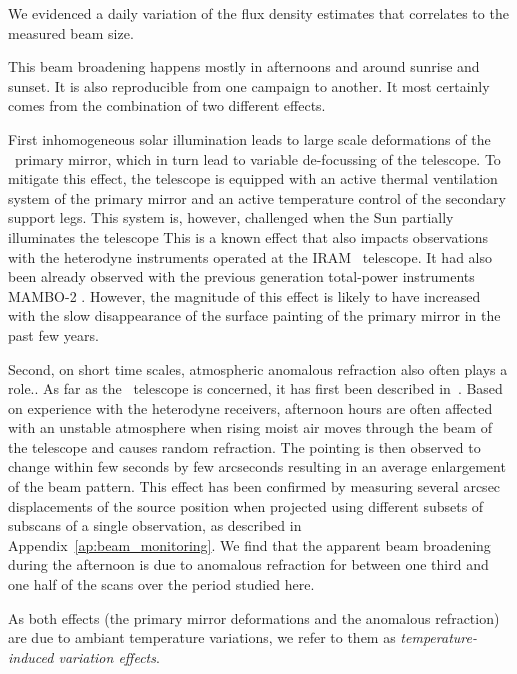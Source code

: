 We evidenced a daily variation of the flux density estimates that correlates to the
measured beam size.

This beam broadening happens mostly in afternoons and around
sunrise and sunset. It is also reproducible from one campaign to another. It most certainly
comes from the combination of two different effects.

First inhomogeneous solar illumination leads to large scale deformations of the
\trentemetre\ primary mirror, which in turn lead to variable de-focussing of the
telescope. {\lp To mitigate this effect, the telescope is equipped with an
  active thermal ventilation system of the primary mirror and an active
  temperature control of the secondary support legs. This system is, however,
  challenged when the Sun partially illuminates the telescope}
  {\lp This is a known effect that also impacts
  observations with the heterodyne instruments operated at the IRAM
  \trentemetre\ telescope. It had also been already observed with the previous
  generation total-power instruments MAMBO-2 \citep{Kreysa1999}.} However, the
magnitude of this effect is likely to have increased with the slow disappearance
of the surface painting of the primary mirror in the past few years.

Second, on short time scales, atmospheric anomalous refraction {\lp also often plays a
  role.}. As far as the \trentemetre\ telescope is concerned, it has first
been described in~\citet{Altenhoff1987}. Based on experience with
  the heterodyne receivers, afternoon hours are
  often affected with an unstable atmosphere when rising moist air moves
  through the beam of the telescope and causes random refraction. The pointing
  is then observed to change within few seconds by few arcseconds {\lp resulting in an average
    enlargement of the beam pattern.} This effect has been confirmed by
  measuring several arcsec displacements of the source position when projected using
  different subsets of subscans of a single observation, as described
  in Appendix~\ref{ap:beam_monitoring}. We find that the apparent beam broadening during
  the afternoon is due to anomalous refraction for between one third
  and one half of the scans over the period studied here.


{\lp As both effects (the primary mirror deformations and the anomalous
  refraction) are due to ambiant temperature variations, we refer to them as
  \emph{temperature-induced variation effects}.}\\


